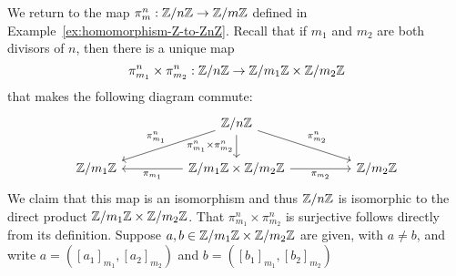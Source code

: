 \begin{example}
    We return to the map \(\pi^n_m : \mathbb{Z}/n\mathbb{Z} \to \mathbb{Z}/m\mathbb{Z}\) defined in
    Example~\ref{ex:homomorphism-Z-to-ZnZ}. Recall that if \(m_1\) and \(m_2\)
    are both divisors of \(n\), then there is a unique map
    \[
        \pi^n_{m_1} \times \pi^n_{m_2}: \mathbb{Z}/n\mathbb{Z} \to \mathbb{Z}/m_1\mathbb{Z} \times \mathbb{Z}/m_2\mathbb{Z}
    \]
    that makes the following diagram commute:
    \[
        \begin{tikzcd}
            &  & \Z/n\Z \arrow[lld, "\pi^n_{m_1}"'] \arrow[rrd, "\pi^n_{m_2}"] \arrow[d, swap, "\pi^n_{m_1} \times \pi^n_{m_2}"] &  &          \\
        \Z/m_1\Z &  & \Z/m_1\Z \times \Z/m_2\Z \arrow[rr, "\pi_{m_2}"'] \arrow[ll, "\pi_{m_1}"]                                 &  & \Z/m_2\Z
        \end{tikzcd}
    \]
    We claim that this map is an isomorphism and thus \(\mathbb{Z}/n\mathbb{Z}\) is isomorphic
    to the direct product \(\mathbb{Z}/m_1\mathbb{Z} \times \mathbb{Z}/m_2\mathbb{Z}\). That \(\pi^n_{m_1}
    \times \pi^n_{m_2}\) is surjective follows directly from its definition.
    Suppose \(a, b \in \mathbb{Z}/m_1\mathbb{Z} \times \mathbb{Z}/m_2\mathbb{Z}\) are given, with \(a \neq b\),
    and write \(a = ([a_1]_{m_1}, [a_2]_{m_2})\) and \(b = ([b_1]_{m_1},
    [b_2]_{m_2})\)
\end{example}

\bigskip

